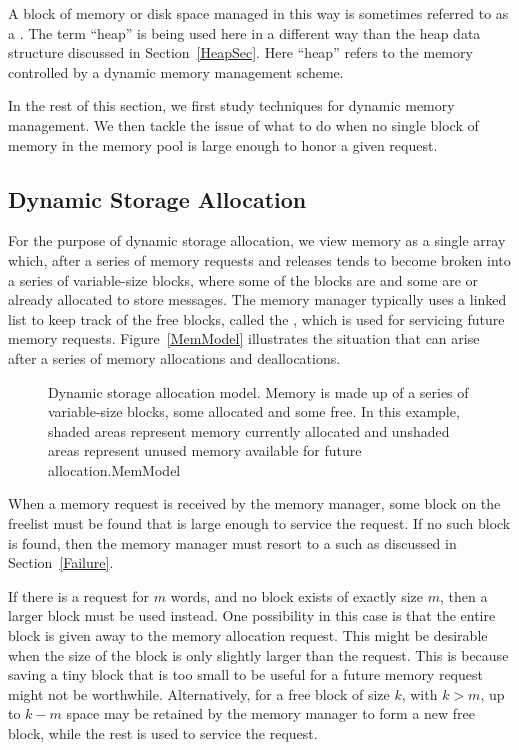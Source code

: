 A block of memory or disk space managed in this way is sometimes
referred to as a .
The term ``heap'' is being used here in a different way
than the heap data structure discussed in Section~\ref{HeapSec}.
Here ``heap'' refers to the memory controlled by a dynamic memory
management scheme.

In the rest of this section, we first study techniques for dynamic
memory management.
We then tackle the issue of what to do when no single block
of memory in the memory pool is large enough to honor a given request.

\subsection{Dynamic Storage Allocation}

For the purpose of dynamic storage allocation, we view memory as a
single array which, after a series of memory requests and releases
tends to become
broken into a series of variable-size blocks, where
some of the blocks are  and some are  or
already allocated to store messages.
The memory manager typically uses a linked list to keep track of the
free blocks, called the , which is used
for servicing future memory requests.
Figure~\ref{MemModel} illustrates the situation that can arise after
a series of memory allocations and deallocations.

\begin{figure}
\vspace{-\medskipamount}
{Dynamic storage allocation model.
Memory is made up of a series of variable-size blocks, some allocated
and some free.
In this example, shaded areas represent memory currently allocated
and unshaded areas represent unused memory available for future
allocation.}{MemModel}
\bigskip
\end{figure}

When a memory request is received by the memory manager, some block
on the freelist must be found that is large enough to service the
request.
If no such block is found, then the memory manager must resort to a
such as discussed in Section~\ref{Failure}.

If there is a request for $m$ words, and no block exists of exactly
size $m$, then a larger block must be used instead.
One possibility in this case is that the entire block is given away
to the memory allocation request.
This might be desirable when the size of the block is only slightly
larger than the request.
This is because saving a tiny block that is too small to be useful for
a future memory request might not be worthwhile.
Alternatively, for a free block of size $k$, with $k > m$, up to
$k - m$ space may be retained by the memory manager to form a new free
block, while the rest is used to service the request.


